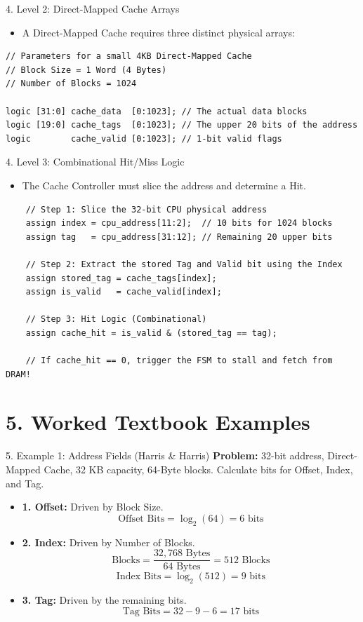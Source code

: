 \documentclass[aspectratio=169]{beamer}
\begin{document}
\begin{frame}[fragile]{4. Level 2: Direct-Mapped Cache Arrays}
\begin{itemize}
    \item A Direct-Mapped Cache requires three distinct physical arrays:
\end{itemize}
\begin{verbatim}
// Parameters for a small 4KB Direct-Mapped Cache
// Block Size = 1 Word (4 Bytes)
// Number of Blocks = 1024 

logic [31:0] cache_data  [0:1023]; // The actual data blocks
logic [19:0] cache_tags  [0:1023]; // The upper 20 bits of the address
logic        cache_valid [0:1023]; // 1-bit valid flags
\end{verbatim}
\end{frame}

\begin{frame}[fragile]{4. Level 3: Combinational Hit/Miss Logic}
\begin{itemize}
    \item The Cache Controller must slice the address and determine a Hit.
\end{itemize}
\begin{verbatim}
    // Step 1: Slice the 32-bit CPU physical address
    assign index = cpu_address[11:2];  // 10 bits for 1024 blocks
    assign tag   = cpu_address[31:12]; // Remaining 20 upper bits

    // Step 2: Extract the stored Tag and Valid bit using the Index
    assign stored_tag = cache_tags[index];
    assign is_valid   = cache_valid[index];

    // Step 3: Hit Logic (Combinational)
    assign cache_hit = is_valid & (stored_tag == tag);
    
    // If cache_hit == 0, trigger the FSM to stall and fetch from DRAM!
\end{verbatim}
\end{frame}

\section{5. Worked Textbook Examples}

\begin{frame}{5. Example 1: Address Fields (Harris \& Harris)}
\textbf{Problem:} 32-bit address, Direct-Mapped Cache, 32 KB capacity, 64-Byte blocks. Calculate bits for Offset, Index, and Tag.
\begin{itemize}
    \item \textbf{1. Offset:} Driven by Block Size.
    \[ \text{Offset Bits} = \log_2(64) = 6 \text{ bits} \]
    \item \textbf{2. Index:} Driven by Number of Blocks.
    \[ \text{Blocks} = \frac{32,768 \text{ Bytes}}{64 \text{ Bytes}} = 512 \text{ Blocks} \]
    \[ \text{Index Bits} = \log_2(512) = 9 \text{ bits} \]
    \item \textbf{3. Tag:} Driven by the remaining bits.
    \[ \text{Tag Bits} = 32 - 9 - 6 = 17 \text{ bits} \]
\end{itemize}
\end{frame}
\end{document}
